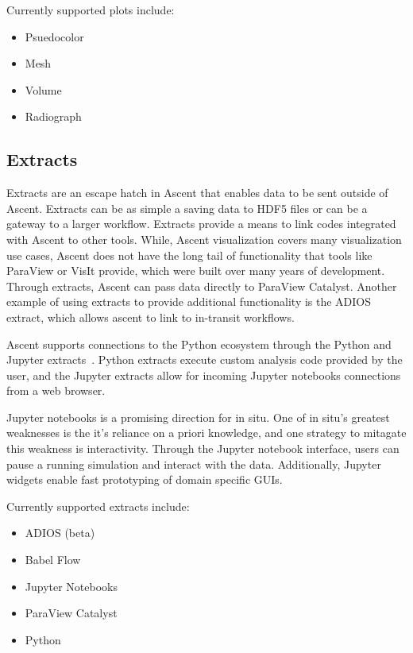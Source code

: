 Currently supported plots include:
\begin{itemize}
\item Psuedocolor
\item Mesh
\item Volume
\item Radiograph
\end{itemize}

\subsection{Extracts}
Extracts are an escape hatch in Ascent that enables data to be sent
outside of Ascent.
%
Extracts can be as simple a saving data to HDF5 files or can be a gateway
to a larger workflow.
Extracts provide a means to link codes integrated with Ascent to other tools.
%
While, Ascent visualization covers many visualization use cases,
Ascent does not have the long tail of functionality that tools like ParaView or VisIt provide, which
were built over many years of development.
%
Through extracts, Ascent can pass data directly to ParaView Catalyst.
%
Another example of using extracts to provide additional functionality is the
ADIOS extract, which allows ascent to link to in-transit workflows.

Ascent supports connections to the Python ecosystem through the Python and
Jupyter extracts~\cite{CyrusISAV}.
%
Python extracts execute custom analysis code provided by the user, and the
Jupyter extracts allow for incoming Jupyter notebooks connections from a web
browser.

Jupyter notebooks is a promising direction for in situ.
%
One of in situ's greatest weaknesses is the it's reliance on a priori
knowledge, and one strategy to mitagate this weakness is interactivity.
%
Through the Jupyter notebook interface, users can pause a running simulation
and interact with the data.
%
Additionally, Jupyter widgets enable fast prototyping of domain specific
GUIs.


Currently supported extracts include:
\begin{itemize}
\item ADIOS (beta)
\item Babel Flow
\item Jupyter Notebooks
\item ParaView Catalyst
\item Python
\end{itemize}

